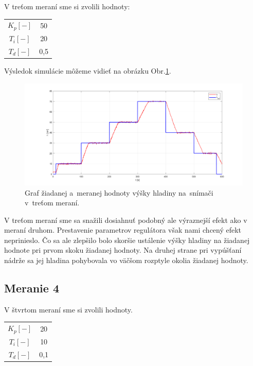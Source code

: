 \documentclass{article}
\begin{document}
V treťom meraní sme si zvolili hodnoty:

\begin{center}
\begin{tabular}{ |c|c| }
 \hline
 $K_p [-]$ & 50 \\
 $T_i [-]$ & 20 \\
 $T_d [-]$ & 0,5 \\
 \hline
\end{tabular}
\end{center}

Výsledok simulácie môžeme vidieť na obrázku Obr.\ref{fig:m3}.

\begin{figure}[!htbp]
	\begin{center}
		\includegraphics[width=\textwidth]{./include/meranie3.png}
	\end{center}
	\caption{Graf žiadanej a~meranej hodnoty výšky hladiny na~snímači v~treťom meraní.}
	\label{fig:m3}
\end{figure}

V treťom meraní sme sa snažili dosiahnuť podobný ale výraznejší efekt ako v meraní druhom. Prestavenie
parametrov regulátora však nami chcený efekt neprinieslo. Čo sa ale zlepšilo bolo skoršie ustálenie výšky
hladiny na žiadanej hodnote pri prvom skoku žiadanej hodnoty. Na druhej strane pri vypúšťaní nádrže sa jej
hladina pohybovala vo väčšom rozptyle okolia žiadanej hodnoty.

\clearpage

\subsection{Meranie 4}
\label{sec:meranie4}

V štvrtom meraní sme si zvolili hodnoty. 

\begin{center}
\begin{tabular}{ |c|c| }
 \hline
 $K_p [-]$ & 20 \\
 $T_i [-]$ & 10 \\
 $T_d [-]$ & 0,1 \\
 \hline
\end{tabular}
\end{center}
\end{document}
